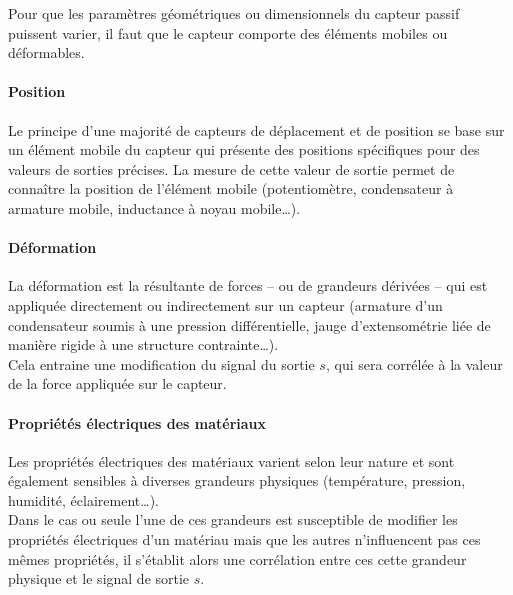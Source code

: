 Pour que les paramètres géométriques ou dimensionnels du capteur passif puissent varier, il faut que le capteur comporte des éléments mobiles ou déformables.\\

\paragraph{Position}

Le principe d'une majorité de capteurs de déplacement et de position se base sur un élément mobile du capteur qui présente des positions spécifiques pour des valeurs de sorties précises. La mesure de cette valeur de sortie permet de connaître la position de l'élément mobile (potentiomètre, condensateur à armature mobile, inductance à noyau mobile\ldots).

\paragraph{Déformation}

La déformation est la résultante de forces -- ou de grandeurs dérivées --  qui est appliquée directement ou indirectement sur un capteur (armature d'un condensateur soumis à une pression différentielle, jauge d'extensométrie liée de manière rigide à une structure contrainte\ldots).\\
Cela entraine une modification du signal du sortie $s$, qui sera corrélée à la valeur de la force appliquée sur le capteur.

\paragraph{Propriétés électriques des matériaux}

Les propriétés électriques des matériaux varient selon leur nature et sont également sensibles à diverses grandeurs physiques (température, pression, humidité, éclairement\ldots).\\
Dans le cas ou seule l'une de ces grandeurs est susceptible de modifier les propriétés électriques d'un matériau mais que les autres n'influencent pas ces mêmes propriétés, il s'établit alors une corrélation entre ces cette grandeur physique et le signal de sortie $s$.

